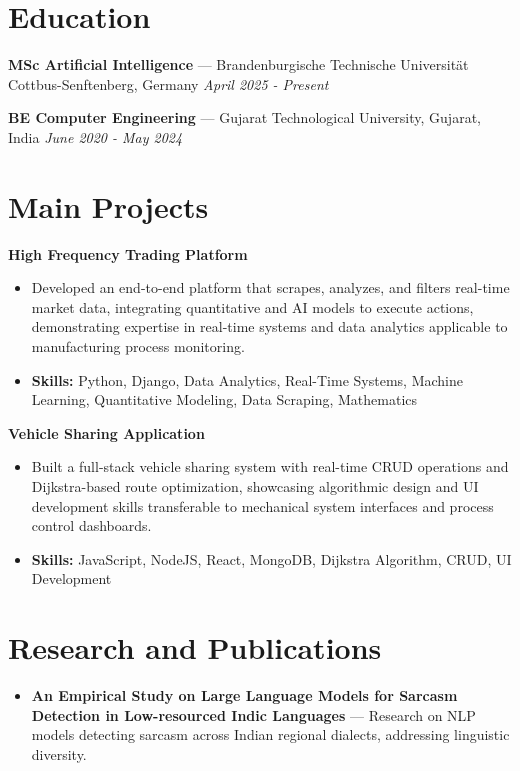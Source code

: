 \documentclass[a4paper,10pt]{article}
\begin{document}
\section*{Education}
\textbf{MSc Artificial Intelligence} — Brandenburgische Technische Universität Cottbus-Senftenberg, Germany \hfill \textit{April 2025 - Present}\par
\vspace{1.5pt}
\textbf{BE Computer Engineering} — Gujarat Technological University, Gujarat, India \hfill \textit{June 2020 - May 2024}\par

\section*{Main Projects}
\textbf{High Frequency Trading Platform}\par
\vspace{1pt}
\begin{itemize}
  \item Developed an end-to-end platform that scrapes, analyzes, and filters real-time market data, integrating quantitative and AI models to execute actions, demonstrating expertise in real-time systems and data analytics applicable to manufacturing process monitoring.
  \item \textbf{Skills:} Python, Django, Data Analytics, Real-Time Systems, Machine Learning, Quantitative Modeling, Data Scraping, Mathematics
\end{itemize}
\vspace{3pt}
\textbf{Vehicle Sharing Application}\par
\vspace{1pt}
\begin{itemize}
  \item Built a full-stack vehicle sharing system with real-time CRUD operations and Dijkstra-based route optimization, showcasing algorithmic design and UI development skills transferable to mechanical system interfaces and process control dashboards.
  \item \textbf{Skills:} JavaScript, NodeJS, React, MongoDB, Dijkstra Algorithm, CRUD, UI Development
\end{itemize}

\section*{Research and Publications}
\begin{itemize}
\item \textbf{An Empirical Study on Large Language Models for Sarcasm Detection in Low-resourced Indic Languages} — Research on NLP models detecting sarcasm across Indian regional dialects, addressing linguistic diversity.
\end{itemize}
\end{document}
